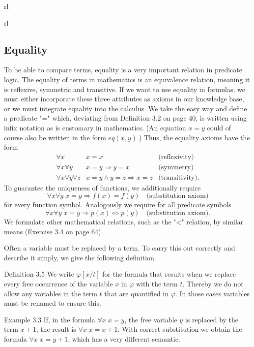 \documentclass[10pt]{book}
\begin{document}
\begin{center}
\begin{tabular}{rl}
\begin{tabular}{rl}
\subsection{Equality}
To be able to compare terms, equality is a very important relation in predicate logic. The equality of terms in mathematics is an equivalence relation, meaning it is reflexive, symmetric and transitive. If we want to use equality in formulas, we must either incorporate these three attributes as axioms in our knowledge base, or we must integrate equality into the calculus. We take the easy way and define a predicate "=" which, deviating from Definition 3.2 on page 40, is written using infix notation as is customary in mathematics. (An equation $x=y$ could of course also be written in the form $eq(x,y)$.) Thus, the equality axioms have the form
\[
\begin{array}{rll}
\forall x & x=x & \text{(reflexivity)}\\
\forall x \forall y & x=y \Rightarrow y=x & \text{(symmetry)}\tag{3.1}\\
\forall x \forall y \forall z & x=y \wedge y=z \Rightarrow x=z & \text{(transitivity).}
\end{array}
\]
To guarantee the uniqueness of functions, we additionally require
\begin{equation*}
\forall x \forall y\; x=y \Rightarrow f(x)=f(y)\quad \text{(substitution axiom)}\tag{3.2}
\end{equation*}
for every function symbol. Analogously we require for all predicate symbols
\begin{equation*}
\forall x \forall y\; x=y \Rightarrow p(x)\Leftrightarrow p(y)\quad \text{(substitution axiom).}\tag{3.3}
\end{equation*}
We formulate other mathematical relations, such as the "<" relation, by similar means (Exercise 3.4 on page 64).

Often a variable must be replaced by a term. To carry this out correctly and describe it simply, we give the following definition.

Definition 3.5 We write $\varphi[x/t]$ for the formula that results when we replace every free occurrence of the variable $x$ in $\varphi$ with the term $t$. Thereby we do not allow any variables in the term $t$ that are quantified in $\varphi$. In those cases variables must be renamed to ensure this.

Example 3.3 If, in the formula $\forall x\; x=y$, the free variable $y$ is replaced by the term $x+1$, the result is $\forall x\; x=x+1$. With correct substitution we obtain the formula $\forall x\; x=y+1$, which has a very different semantic.


\end{tabular}
\end{tabular}
\end{center}
\end{document}
